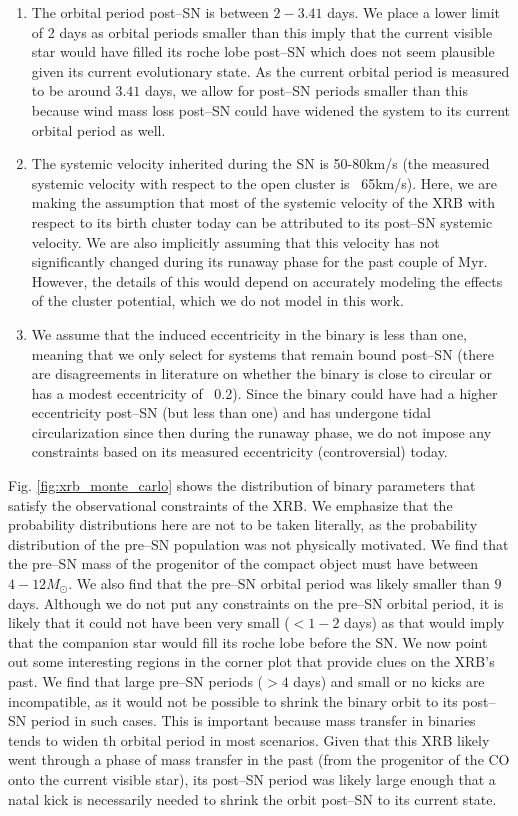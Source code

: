 \documentclass[linenumbers,trackchanges,twocolumn]{aastex701}
\begin{document}
\begin{enumerate}
        \item The orbital period post--SN is between $2-3.41$ days. We place a lower limit of 2 days as orbital periods smaller than this imply that the current visible star would have filled its roche lobe post--SN which does not seem plausible given its current evolutionary state. As the current orbital period is measured to be around $3.41$ days, we allow for post--SN periods smaller than this because wind mass loss post--SN could have widened the system to its current orbital period as well.
        \item The systemic velocity inherited during the SN is 50-80km/s (the measured systemic velocity with respect to the open cluster is ~65km/s). Here, we are making the assumption that most of the systemic velocity of the XRB with respect to its birth cluster today can be attributed to its post--SN systemic velocity. We are also implicitly assuming that this velocity has not significantly changed during its runaway phase for the past couple of Myr. However, the details of this would depend on accurately modeling the effects of the cluster potential, which we do not model in this work.
        \item We assume that the induced eccentricity in the binary is less than one, meaning that we only select for systems that remain bound post--SN (there are disagreements in literature on whether the binary is close to circular or has a modest eccentricity of ~0.2). Since the binary could have had a higher eccentricity post--SN (but less than one) and has undergone tidal circularization since then during the runaway phase, we do not impose any constraints based on its measured eccentricity (controversial) today.
\end{enumerate}

Fig. \ref{fig:xrb_monte_carlo} shows the distribution of binary parameters that satisfy the observational constraints of the XRB. We emphasize that the probability distributions here are not to be taken literally, as the probability distribution of the pre--SN population was not physically motivated. We find that the pre--SN mass of the progenitor of the compact object must have between $4-12M_{\odot}$. We also find that the pre--SN orbital period was likely smaller than $9$ days. Although we do not put any constraints on the pre--SN orbital period, it is likely that it could not have been very small ($<1-2$ days) as that would imply that the companion star would fill its roche lobe before the SN. We now point out some interesting regions in the corner plot that provide clues on the XRB's past. We find that large pre--SN periods ($>4$ days) and small or no kicks are incompatible, as it would not be possible to shrink the binary orbit to its post--SN period in such cases. This is important because mass transfer in binaries tends to widen th orbital period in most scenarios. Given that this XRB likely went through a phase of mass transfer in the past (from the progenitor of the CO onto the current visible star), its post--SN period was likely large enough that a natal kick is necessarily needed to shrink the orbit post--SN to its current state. 
\end{document}
